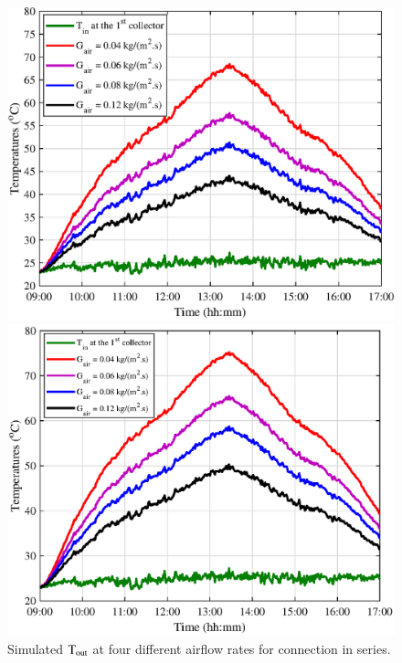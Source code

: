 \begin{figure}[ht!]
	\begin{minipage}{0.49\columnwidth}
		\includegraphics[scale=0.49]{figs/series_2nd.eps}
		
	\end{minipage}
	\begin{minipage}{0.49\columnwidth}
		\includegraphics[scale=0.49]{figs/series_3rd.eps}
		
	\end{minipage}
	\caption{Simulated $\rm{T_{out}}$ at four different airflow rates for connection in series.}
	\label{Temp-series}
\end{figure}

